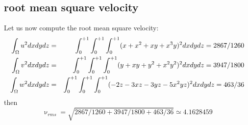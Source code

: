 \subsection{root mean square velocity}

Let us now compute the root mean square velocity:
\begin{eqnarray}
\int_\Omega u^2 dx dy dz 
&=& \int_{0}^{+1}\int_{0}^{+1}\int_{0}^{+1} (x+x^2+xy+x^3y )^2 dx dy dz = 2867/1260 \nonumber \\
\int_\Omega v^2 dx dy dz 
&=& \int_{0}^{+1}\int_{0}^{+1}\int_{0}^{+1} (y + xy + y^2 + x^2 y^2 )^2 dx dy dz = 3947/1800 \nonumber  \\
\int_\Omega w^2 dx dy dz 
&=& \int_{0}^{+1}\int_{0}^{+1}\int_{0}^{+1} (-2z - 3xz - 3yz - 5x^2 yz )^2 dx dy dz = 463/36   \nonumber
\end{eqnarray}
then
\[
\upnu_{rms}=\sqrt{ 2867/1260 + 3947/1800 + 463/36  } \simeq 4.1628459
\]

